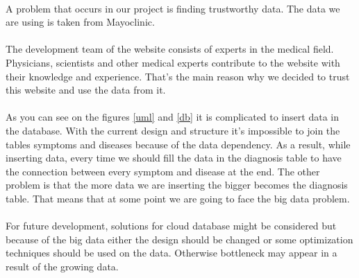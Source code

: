 \paragraph{}
A problem that occurs in our project is finding trustworthy data. The data we are using is taken from Mayoclinic\cite{bib:misc:4}.
\paragraph{}
The development team of the website consists of experts in the medical field. 
Physicians, scientists and other medical experts contribute to the website with their knowledge and experience. That’s the main reason why we decided to trust this website and use the data from it.   
\paragraph{}
As you can see on the figures \ref{uml} and \ref{db} it is complicated to insert data in the database.
With the current design and structure it’s impossible to join the tables symptoms and diseases because of the data dependency. As a result, while inserting data, every time we should fill the data in the diagnosis table to have the connection between every symptom and disease at the end. 
The other problem is that the more data we are inserting the bigger becomes the diagnosis table. That means that at some point we are going to face the big data problem.
\paragraph{}
For future development, solutions for cloud database might be considered but because of the big data either the design should be changed or some optimization techniques should be used on the data. Otherwise bottleneck may appear in a result of the growing data. 

